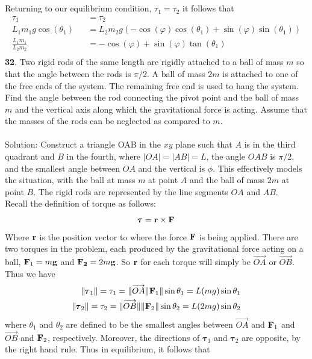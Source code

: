 \documentclass[12pt]{amsbook}
\begin{document}
\\
\\
Returning to our equilibrium condition, ${\tau}_1={\tau}_2$ it follows that 
\begin{eqnarray*}
{\tau}_1&&={\tau}_2\\
L_1m_1g\cos(\theta_1)&&= L_2m_2g(-\cos(\varphi)\cos(\theta_1)+\sin(\varphi)\sin(\theta_1))\\
\frac{L_1m_1}{L_2m_2}&&=-\cos(\varphi)+\sin(\varphi)\tan(\theta_1)\\
\end{eqnarray*} 
{\small\bf 32}. Two rigid rods of the same length 
are rigidly attached to a ball of mass $m$ so that 
the angle between the rods is $\pi/2$. A ball of 
mass $2m$ is attached to one 
of the free ends of the system. The remaining 
free end is used to hang the system. Find the angle 
between the rod connecting the pivot point and the 
ball of mass $m$ and the vertical axis along which 
the gravitational force is acting. Assume that the masses
of the rods can be neglected as compared to $m$.\\
\\
{\sc Solution}: Construct a triangle OAB in the $xy$ plane such that $A$ is in the third quadrant and $B$ in the fourth, where $|OA|=|AB|=L$, the angle $OAB$ is $\pi/2$, and the smallest angle between $OA$ and the vertical is $\phi$. This effectively models the situation, with the ball at mass $m$ at point $A$ and the ball of mass $2m$ at point $B$. The rigid rods are represented by the line segments $OA$ and $AB$. \\
Recall the definition of torque as follows:
$${\pmb \tau}={\bf r}\times{\bf F}$$
Where $\bf r$ is the position vector to where the force $\bf F$ is being applied. There are two torques in the problem, each produced by the gravitational force acting on a ball, ${\bf F}_1=m{\bf g}$ and ${\bf F_2}=2m{\bf g}$. So $\bf r$ for each torque will simply be $\overrightarrow{OA}$ or $\overrightarrow{OB}$. Thus we have
\begin{eqnarray*}
\|{\pmb \tau}_1\|={\tau}_1=\|\overrightarrow{OA}\|{\bf F}_1\|\sin\theta_1=L(mg)\sin\theta_1 \\
\|{\pmb \tau}_2\|={\tau}_2=\|\overrightarrow{OB}\|\|{\bf F}_2\|\sin\theta_2=L(2mg)\sin\theta_2
\end{eqnarray*}
where $\theta_1$ and $\theta_2$ are defined to be the smallest angles between $\overrightarrow{OA}$ and ${\bf F}_1$ and $\overrightarrow{OB}$ and ${\bf F}_2$, respectively. Moreover, the directions of ${\pmb \tau}_1$ and ${\pmb \tau}_2$ are opposite, by the right hand rule. Thus in equilibrium, it follows that
\end{document}
